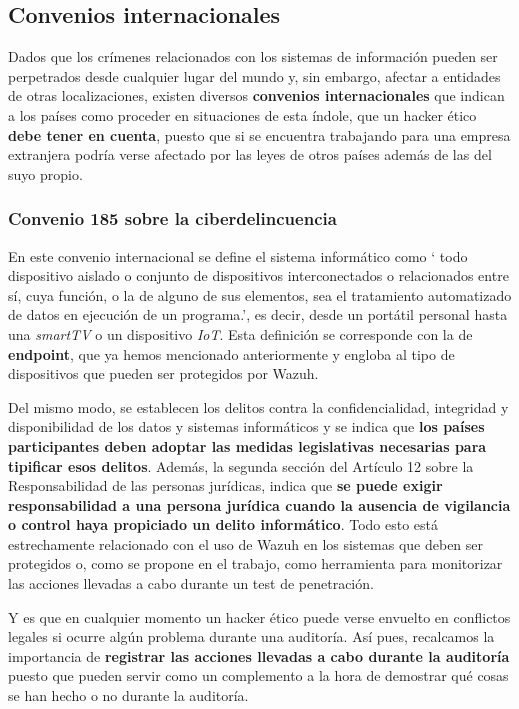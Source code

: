 \subsection{Convenios internacionales}

Dados que los crímenes relacionados con los sistemas de información pueden ser perpetrados desde cualquier lugar del mundo y, sin embargo, afectar a entidades de otras localizaciones, existen diversos \textbf{convenios internacionales} que indican a los países como proceder en situaciones de esta índole, que un hacker ético \textbf{debe tener en cuenta}, puesto que si se encuentra trabajando para una empresa extranjera podría verse afectado por las leyes de otros países además de las del suyo propio.

\subsubsection{Convenio 185 sobre la ciberdelincuencia}

En este convenio internacional se define el sistema informático como ` todo dispositivo aislado o conjunto de dispositivos interconectados o relacionados entre sí, cuya función, o la de alguno de sus elementos, sea el tratamiento automatizado de datos en ejecución de un programa.', es decir, desde un portátil personal hasta una \textit{smartTV} o un dispositivo \textit{IoT}. Esta definición se corresponde con la de \textbf{endpoint}, que ya hemos mencionado anteriormente y engloba al tipo de dispositivos que pueden ser protegidos por Wazuh.

Del mismo modo, se establecen los delitos contra la confidencialidad, integridad y disponibilidad de los datos y sistemas informáticos y se indica que \textbf{los países participantes deben adoptar las medidas legislativas necesarias para tipificar esos delitos}. Además, la segunda sección del Artículo 12  sobre la Responsabilidad de las personas jurídicas, indica que \textbf{se puede exigir responsabilidad a una persona jurídica cuando la ausencia de vigilancia o control haya propiciado un delito informático}. Todo esto está estrechamente relacionado con el uso de Wazuh en los sistemas que deben ser protegidos o, como se propone en el trabajo, como herramienta para monitorizar las acciones llevadas a cabo durante un test de penetración.

Y es que en cualquier momento un hacker ético puede verse envuelto en conflictos legales si ocurre algún problema durante una auditoría. Así pues, recalcamos la importancia de \textbf{registrar las acciones llevadas a cabo durante la auditoría} puesto que pueden servir como un complemento a la hora de demostrar qué cosas se han hecho o no durante la auditoría.

